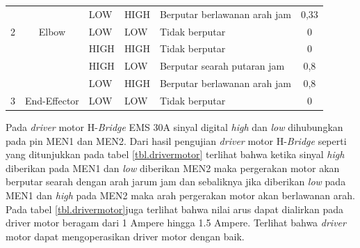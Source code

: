 \begin{table}[H]
\begin{tabular}{|c|c|l|l|l|c|}
			&                                                 & LOW                          & HIGH                         & Berputar berlawanan arah jam                                           & 0,33                                                \\ \cline{3-6} 
			\multirow{-4}{*}{2}                          & \multirow{-4}{*}{Elbow}                         & LOW                          & LOW                          & Tidak berputar                                                         & 0                                                   \\ \hline
			&                                                 & HIGH                         & HIGH                         & Tidak berputar                                                         & 0                                                   \\ \cline{3-6} 
			&                                                 & HIGH                         & LOW                          & Berputar searah putaran jam                                            & 0,8                                                 \\ \cline{3-6} 
			&                                                 & LOW                          & HIGH                         & Berputar berlawanan arah jam                                           & 0,8                                                 \\ \cline{3-6} 
			\multirow{-4}{*}{3}                          & \multirow{-4}{*}{End-Effector}                  & LOW                          & LOW                          & Tidak berputar                                                         & 0                                                   \\ \hline
		\end{tabular}
\end{table} 

 Pada \textit{driver} motor H-\textit{Bridge} EMS 30A sinyal digital \textit{high} dan \textit{low} dihubungkan pada pin MEN1 dan MEN2. Dari hasil pengujian \textit{driver} motor H-\textit{Bridge} seperti yang ditunjukkan pada tabel \ref{tbl.drivermotor} terlihat bahwa ketika sinyal \textit{high} diberikan pada MEN1 dan \textit{low} diberikan MEN2 maka pergerakan motor akan berputar searah dengan arah jarum jam dan sebaliknya jika diberikan \textit{low} pada MEN1 dan \textit{high} pada MEN2 maka arah pergerakan motor akan berlawanan arah. Pada tabel \ref{tbl.drivermotor}juga terlihat bahwa nilai arus dapat dialirkan pada driver motor beragam dari 1 Ampere hingga 1.5 Ampere. Terlihat bahwa \textit{driver} motor dapat mengoperasikan driver motor dengan baik.


